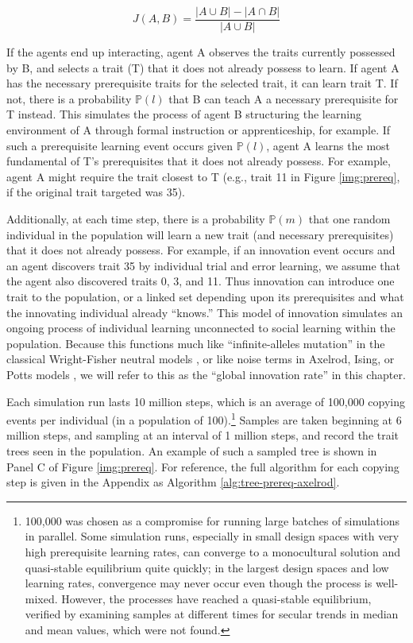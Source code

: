 \documentclass[referee,graybox,natbib]{svmult}
\begin{document}
\begin{equation}J(A,B) = \frac{|A \cup B| - |A \cap B|}{|A \cup B|}\end{equation}

If the agents end up interacting, agent A observes the traits currently
possessed by B, and selects a trait (T) that it does not already possess
to learn. If agent A has the necessary prerequisite traits for the
selected trait, it can learn trait T. If not, there is a probability
$\mathbb{P}(l)$ that B can teach A a necessary prerequisite for T
instead. This simulates the process of agent B structuring the learning
environment of A through formal instruction or apprenticeship, for
example. If such a prerequisite learning event occurs given
$\mathbb{P}(l)$, agent A learns the most fundamental of T's
prerequisites that it does not already possess. For example, agent A
might require the trait closest to T (e.g., trait 11 in Figure
\ref{img:prereq}, if the original trait targeted was 35).

Additionally, at each time step, there is a probability $\mathbb{P}(m)$
that one random individual in the population will learn a new trait (and
necessary prerequisites) that it does not already possess. For example,
if an innovation event occurs and an agent discovers trait 35 by
individual trial and error learning, we assume that the agent also
discovered traits 0, 3, and 11. Thus innovation can introduce one trait
to the population, or a linked set depending upon its prerequisites and
what the innovating individual already ``knows.'' This model of
innovation simulates an ongoing process of individual learning
unconnected to social learning within the population. Because this
functions much like ``infinite-alleles mutation'' in the classical
Wright-Fisher neutral models \citep{Ewens2004}, or like noise terms in
Axelrod, Ising, or Potts models \citep{castellano2009statistical}, we
will refer to this as the ``global innovation rate'' in this chapter.

Each simulation run lasts 10 million steps, which is an average of
100,000 copying events per individual (in a population of
100).\footnote{100,000 was chosen as a compromise for running large
  batches of simulations in parallel. Some simulation runs, especially
  in small design spaces with very high prerequisite learning rates, can
  converge to a monocultural solution and quasi-stable equilibrium quite
  quickly; in the largest design spaces and low learning rates,
  convergence may never occur even though the process is well-mixed.
  However, the processes have reached a quasi-stable equilibrium,
  verified by examining samples at different times for secular trends in
  median and mean values, which were not found.} Samples are taken
beginning at 6 million steps, and sampling at an interval of 1 million
steps, and record the trait trees seen in the population. An example of
such a sampled tree is shown in Panel C of Figure \ref{img:prereq}. For
reference, the full algorithm for each copying step is given in the
Appendix as Algorithm \ref{alg:tree-prereq-axelrod}.
\end{document}
